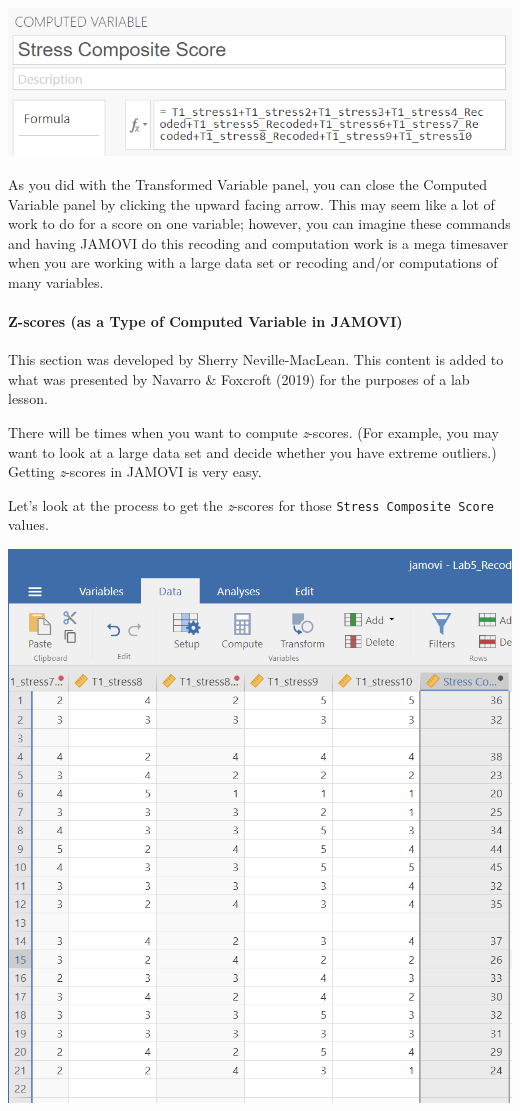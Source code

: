 \documentclass[
]{book}
\begin{document}
\includegraphics{img/StressScale_ComputationFormula2.png}

As you did with the Transformed Variable panel, you can close the Computed Variable panel by clicking the upward facing arrow.
This may seem like a lot of work to do for a score on one variable; however, you can imagine these commands and having JAMOVI do this recoding and computation work is a mega timesaver when you are working with a large data set or recoding and/or computations of many variables.

\hypertarget{z-scores-as-a-type-of-computed-variable-in-jamovi}{%
\paragraph{Z-scores (as a Type of Computed Variable in JAMOVI)}\label{z-scores-as-a-type-of-computed-variable-in-jamovi}}

This section was developed by Sherry Neville-MacLean. This content is added to what was presented by Navarro \& Foxcroft (2019) for the purposes of a lab lesson.

There will be times when you want to compute \emph{z}-scores. (For example, you may want to look at a large data set and decide whether you have extreme outliers.) Getting \emph{z}-scores in JAMOVI is very easy.

Let's look at the process to get the \emph{z}-scores for those \texttt{Stress\ Composite\ Score} values.

\includegraphics{img/StressScale_Column.png}
\end{document}

